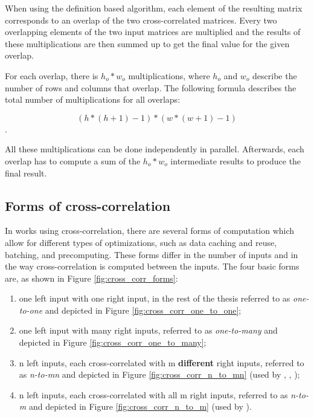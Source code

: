 When using the definition based algorithm, each element of the resulting matrix corresponds to an overlap of the two cross-correlated matrices. Every two overlapping elements of the two input matrices are multiplied and the results of these multiplications are then summed up to get the final value for the given overlap.

For each overlap, there is $h_o * w_o$ multiplications, where $h_o$ and $w_o$ describe the number of rows and columns that overlap. The following formula describes the total number of multiplications for all overlaps:

\[
	(h*(h+1)-1)*(w*(w+1)-1)
\].

All these multiplications can be done independently in parallel. Afterwards, each overlap has to compute a sum of the $h_o * w_o$ intermediate results to produce the final result.



\subsection{Forms of cross-correlation}
\label{sec:cross_corr_forms}

In works using cross-correlation, there are several forms of computation which allow for different types of optimizations, such as data caching and reuse, batching, and precomputing. These forms differ in the number of inputs and in the way cross-correlation is computed between the inputs. 
The four basic forms are, as shown in Figure \ref{fig:cross_corr_forms}:

\begin{enumerate}
	\item one left input with one right input, in the rest of the thesis referred to as \textit{one-to-one} and depicted in Figure \ref{fig:cross_corr_one_to_one};
	\item one left input with many right inputs, referred to as \textit{one-to-many} and depicted in Figure \ref{fig:cross_corr_one_to_many};
	\item n left inputs, each cross-correlated with m \textbf{different} right inputs, referred to as \textit{n-to-mn} and depicted in Figure \ref{fig:cross_corr_n_to_mn} (used by \citet{misko}, \citet{zhang2015}, \citet{Kapinchev2015});
	\item n left inputs, each cross-correlated with all m right inputs, referred to as \textit{n-to-m} and depicted in Figure \ref{fig:cross_corr_n_to_m} (used by \citet{Clark2011}).
\end{enumerate} 

